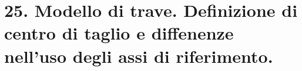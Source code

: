 \section{25. Modello di trave. Definizione di centro di taglio e diffenenze nell'uso degli assi di riferimento.}


